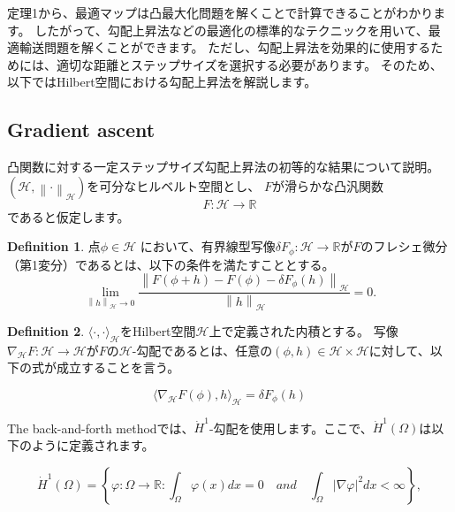 \documentclass{jsarticle}
\theoremstyle{definition}
\newtheorem{dfn}{Definition}[section]
\begin{document}
定理1から、最適マップは凸最大化問題を解くことで計算できることがわかります。
したがって、勾配上昇法などの最適化の標準的なテクニックを用いて、最適輸送問題を解くことができます。
ただし、{\color{red}勾配上昇法を効果的に使用するためには、適切な距離とステップサイズを選択する必要があります。}
そのため、以下ではHilbert空間における勾配上昇法を解説します。

\subsection{Gradient ascent}
凸関数に対する一定ステップサイズ勾配上昇法の初等的な結果について説明。
$(\mathcal{H} , \left\lVert \cdot  \right\rVert_\mathcal{H})$を可分なヒルベルト空間とし、 $F$が滑らかな凸汎関数
\begin{equation*}
  F: \mathcal{H} \to \mathbb{R}
\end{equation*}
であると仮定します。

\begin{dfn}
  点$\phi \in \mathcal{H}$ において、有界線型写像$\delta F_\phi: \mathcal{H} \to \mathbb{R}$が$F$のフレシェ微分（第1変分）であるとは、以下の条件を満たすこととする。
  \begin{equation*}
    \lim_{\left\lVert h \right\rVert_{\mathcal{H}} \to 0} \frac{\left\lVert F(\phi + h) - F(\phi) - \delta F_\phi (h) \right\rVert_{\mathcal{H}}}{\left\lVert h \right\rVert_{\mathcal{H}}} = 0.
  \end{equation*}
\end{dfn}


\begin{dfn}
  $\langle \cdot, \cdot \rangle_\mathcal{H}$をHilbert空間$\mathcal{H}$上で定義された内積とする。
  写像$\nabla_\mathcal{H} F: \mathcal{H} \to \mathcal{H} $が$F$の$\mathcal{H}$-勾配であるとは、任意の$(\phi, h) \in \mathcal{H} \times \mathcal{H}$に対して、以下の式が成立することを言う。

  \begin{equation*}
    \langle \nabla_\mathcal{H} F(\phi), h \rangle_\mathcal{H} = \delta F_\phi(h)
  \end{equation*}

\end{dfn}

The back-and-forth methodでは、$\dot{H}^1$-勾配を使用します。ここで、$\dot{H}^1(\Omega)$は以下のように定義されます。

\begin{equation}
\dot{H}^1(\Omega) = \left\{ \varphi: \Omega \rightarrow \mathbb{R} : \int_\Omega \varphi(x) dx = 0 \quad and \quad \int_{\Omega} |\nabla \varphi|^2 dx < \infty \right\},
\end{equation}
\end{document}
